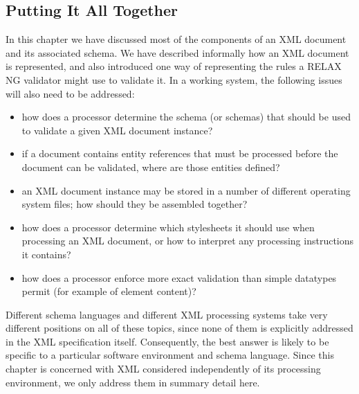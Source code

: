 \subsection[{Putting It All Together}]{Putting It All Together}\label{SG18}\par
In this chapter we have discussed most of the components of an XML document and its associated schema. We have described informally how an XML document is represented, and also introduced one way of representing the rules a RELAX NG validator might use to validate it. In a working system, the following issues will also need to be addressed: \begin{itemize}
\item how does a processor determine the schema (or schemas) that should be used to validate a given XML document instance?
\item if a document contains entity references that must be processed before the document can be validated, where are those entities defined?
\item an XML document instance may be stored in a number of different operating system files; how should they be assembled together?
\item how does a processor determine which stylesheets it should use when processing an XML document, or how to interpret any processing instructions it contains?
\item how does a processor enforce more exact validation than simple datatypes permit (for example of element content)?
\end{itemize} \par
Different schema languages and different XML processing systems take very different positions on all of these topics, since none of them is explicitly addressed in the XML specification itself. Consequently, the best answer is likely to be specific to a particular software environment and schema language. Since this chapter is concerned with XML considered independently of its processing environment, we only address them in summary detail here.

